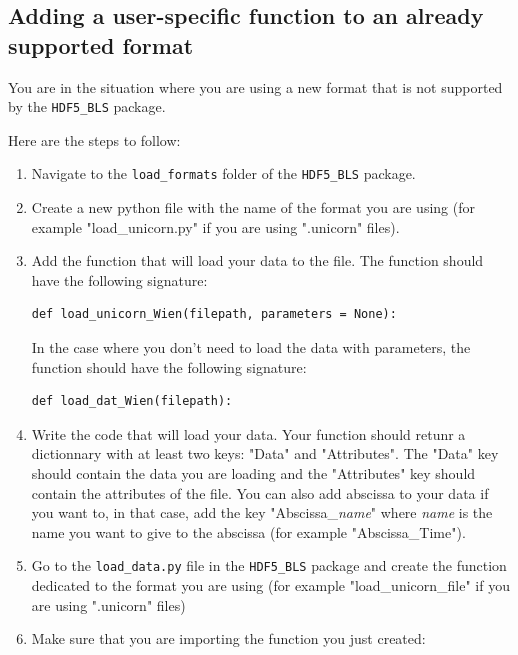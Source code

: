 \documentclass{book}
\begin{document}
        \subsection{Adding a user-specific function to an already supported format} \label{subsec:load_data.new_format}

            \begin{tcolorbox}
                You are in the situation where you are using a new format that is not supported by the \texttt{HDF5\_BLS} package.
            \end{tcolorbox}

            Here are the steps to follow:
            \begin{enumerate}
                \item Navigate to the \texttt{load\_formats} folder of the \texttt{HDF5\_BLS} package. 
                \item Create a new python file with the name of the format you are using (for example "load\_unicorn.py" if you are using ".unicorn" files).
                \item Add the function that will load your data to the file. The function should have the following signature:
\begin{lstlisting}
def load_unicorn_Wien(filepath, parameters = None):
\end{lstlisting}
                In the case where you don't need to load the data with parameters, the function should have the following signature:
\begin{lstlisting}
def load_dat_Wien(filepath):
\end{lstlisting}
                \item Write the code that will load your data. Your function should retunr a dictionnary with at least two keys: "Data" and "Attributes". The "Data" key should contain the data you are loading and the "Attributes" key should contain the attributes of the file. You can also add abscissa to your data if you want to, in that case, add the key "Abscissa\_\textsl{name}" where \textsl{name} is the name you want to give to the abscissa (for example "Abscissa\_Time").
                \item Go to the \texttt{load\_data.py} file in the \texttt{HDF5\_BLS} package and create the function dedicated to the format you are using (for example "load\_unicorn\_file" if you are using ".unicorn" files)
                \item Make sure that you are importing the function you just created:

\end{enumerate}
\end{document}
